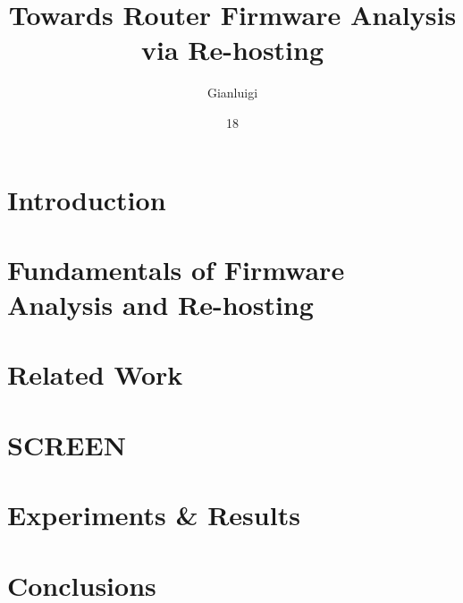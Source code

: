 \documentclass[tg, eng, dv]{ita}    %
\author{Gianluigi}{Dal Toso}
\title{Towards Router Firmware Analysis via Re-hosting}
\date{18}{NOVEMBER}{2021}
\begin{document}


\mainmatter

\chapter{Introduction}\label{chap:introduction}


\chapter{Fundamentals of Firmware Analysis and Re-hosting}\label{chap:fundamentals}


\chapter{Related Work}\label{chap:related}


\chapter{SCREEN}\label{chap:screen}


\chapter{Experiments \& Results}\label{chap:exp_and_results}


% 

\chapter{Conclusions}\label{chap:conclusions}


% 

% 
\end{document}
